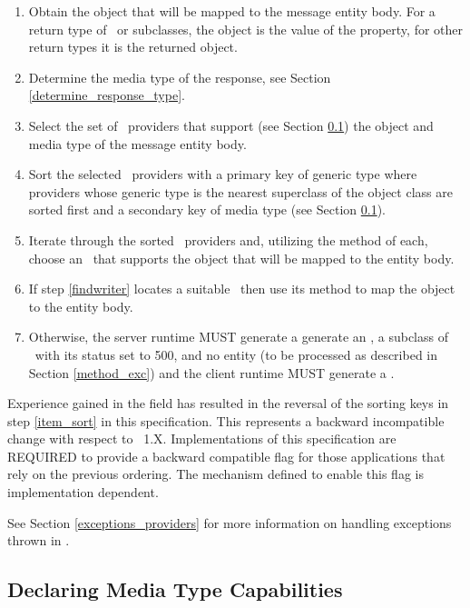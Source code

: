 \begin{enumerate}
\item Obtain the object that will be mapped to the message entity body. For a return type of \Response\ or subclasses, the object is the value of the  property, for other return types it is the returned object.
\item Determine the media type of the response, see Section \ref{determine_response_type}.
\item Select the set of \MsgWrite\ providers that support (see Section \ref{declaring_provider_capabilities}) the object and media type of the message entity body.
\item\label{item_sort} Sort the selected \MsgWrite\ providers with a primary key of generic type where providers whose generic type is the nearest superclass of the object class are sorted first and a secondary key of media type (see Section \ref{declaring_provider_capabilities}).
\item\label{findwriter} Iterate through the sorted \MsgWrite\ providers and, utilizing the  method of each, choose an \MsgWrite\ that supports the object that will be mapped to the entity body.
\item If step \ref{findwriter} locates a suitable \MsgWrite\ then use its  method to map the object to the entity body. 
\item Otherwise, the server runtime MUST generate a generate an , a subclass of \WebAppExc\ with its status set to 500, and no entity (to be processed as described in Section \ref{method_exc}) and the client runtime MUST generate a .

\end{enumerate}

Experience gained in the field has resulted in the reversal of the sorting keys in step
\ref{item_sort} in this specification. This represents a backward incompatible change
with respect to \jaxrs\ 1.X. Implementations of this specification are REQUIRED to
provide a backward compatible flag for those applications that rely on the previous
ordering. The mechanism defined to enable this flag is implementation dependent.

See Section \ref{exceptions_providers} for more information on handling exceptions thrown in \MsgWrite{}.

\subsection{Declaring Media Type Capabilities}
\label{declaring_provider_capabilities}

